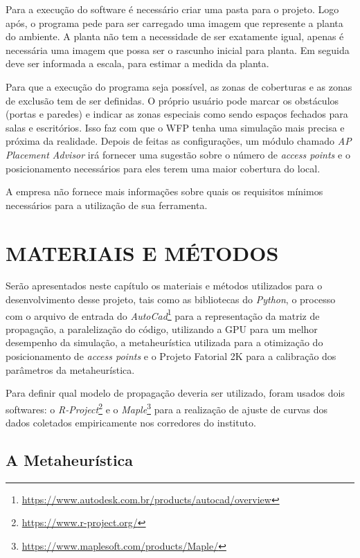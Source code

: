 \documentclass[
	12pt,				%
	openright,			%
	twoside,			%
	a4paper,			%
	english,			%
	french,				%
	spanish,			%
	brazil				%
	]{abntex2}
\begin{document}
Para a execução do software é necessário criar uma pasta para o projeto. Logo após, o programa pede para ser carregado uma imagem que represente a planta do ambiente. A planta não tem a necessidade de ser exatamente igual, apenas é necessária uma imagem que possa ser o rascunho inicial para planta. Em seguida deve ser informada a escala, para estimar a medida da planta.

Para que a execução do programa seja possível, as zonas de coberturas e as zonas de exclusão tem de ser definidas. O próprio usuário pode marcar os obstáculos (portas e paredes) e indicar as zonas especiais como sendo espaços fechados para salas e escritórios. Isso faz com que o WFP tenha uma simulação mais precisa e próxima da realidade. Depois de feitas as configurações, um módulo chamado \textit{AP Placement Advisor} irá fornecer uma sugestão sobre o número de \textit{access points} e o posicionamento necessários para eles terem uma maior cobertura do local.

A empresa não fornece mais informações sobre quais os requisitos mínimos necessários para a utilização de sua ferramenta. 


\chapter[MATERIAIS E MÉTODOS]{MATERIAIS E MÉTODOS}

Serão apresentados neste capítulo os materiais e métodos utilizados para o desenvolvimento desse projeto, tais como as bibliotecas do \textit{Python}, o processo com o arquivo de entrada do \textit{AutoCad}\footnote{\url{https://www.autodesk.com.br/products/autocad/overview}} para a representação da matriz de propagação, a paralelização do código, utilizando a GPU para um melhor desempenho da simulação, a metaheurística utilizada para a otimização do posicionamento de \textit{access points} e o Projeto Fatorial 2K para a calibração dos parâmetros da metaheurística.

Para definir qual modelo de propagação deveria ser utilizado, foram usados dois softwares: o \textit{R-Project}\footnote{\url{https://www.r-project.org/}} e o \textit{Maple}\footnote{\url{https://www.maplesoft.com/products/Maple/}} para a realização de ajuste de curvas dos dados coletados empiricamente nos corredores do instituto. 

\section[A Metaheurística]{A Metaheurística}
\end{document}
